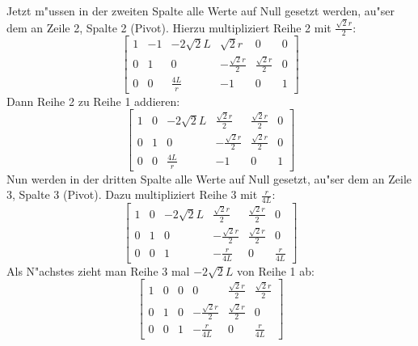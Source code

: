 \documentclass[11pt]{article}
\begin{document}
    Jetzt m"ussen in der zweiten Spalte alle Werte auf Null gesetzt werden, au"ser dem an Zeile 2, Spalte 2 (Pivot).
    Hierzu multipliziert Reihe 2 mit $\frac{\sqrt{2}r}{2}$:
    \begin{equation}
        \left[\begin{array}{ccc|ccc}
                  1 & -1 & -2\sqrt{2}L  & \sqrt{2}r            & 0                   & 0 \\
                  0 & 1  & 0            & -\frac{\sqrt{2}r}{2} & \frac{\sqrt{2}r}{2} & 0 \\
                  0 & 0  & \frac{4L}{r} & -1                   & 0                   & 1
        \end{array}\right]\label{eq:pivottwo}
    \end{equation}
    Dann Reihe 2 zu Reihe 1 addieren:
    \begin{equation}
        \left[\begin{array}{ccc|ccc}
                  1 & 0 & -2\sqrt{2}L  & \frac{\sqrt{2}r}{2}  & \frac{\sqrt{2}r}{2} & 0 \\
                  0 & 1 & 0            & -\frac{\sqrt{2}r}{2} & \frac{\sqrt{2}r}{2} & 0 \\
                  0 & 0 & \frac{4L}{r} & -1                   & 0                   & 1
        \end{array}\right]\label{eq:r2tor1}
    \end{equation}
    Nun werden in der dritten Spalte alle Werte auf Null gesetzt, au"ser dem an Zeile 3, Spalte 3 (Pivot).
    Dazu multipliziert Reihe 3 mit $\frac{r}{4L}$:
    \begin{equation}
        \left[\begin{array}{ccc|ccc}
                  1 & 0 & -2\sqrt{2}L & \frac{\sqrt{2}r}{2}  & \frac{\sqrt{2}r}{2} & 0            \\
                  0 & 1 & 0           & -\frac{\sqrt{2}r}{2} & \frac{\sqrt{2}r}{2} & 0            \\
                  0 & 0 & 1           & -\frac{r}{4L}        & 0                   & \frac{r}{4L}
        \end{array}\right]\label{eq:pivot3}
    \end{equation}
    Als N"achstes zieht man Reihe 3 mal $-2\sqrt{2}L$ von Reihe 1 ab:
    \begin{equation}
        \left[\begin{array}{ccc|ccc}
                  1 & 0 & 0 & 0                    & \frac{\sqrt{2}r}{2} & \frac{\sqrt{2}r}{2} \\
                  0 & 1 & 0 & -\frac{\sqrt{2}r}{2} & \frac{\sqrt{2}r}{2} & 0                   \\
                  0 & 0 & 1 & -\frac{r}{4L}        & 0                   & \frac{r}{4L}
        \end{array}\right]\label{eq:mult3p1}
    \end{equation}
\end{document}
